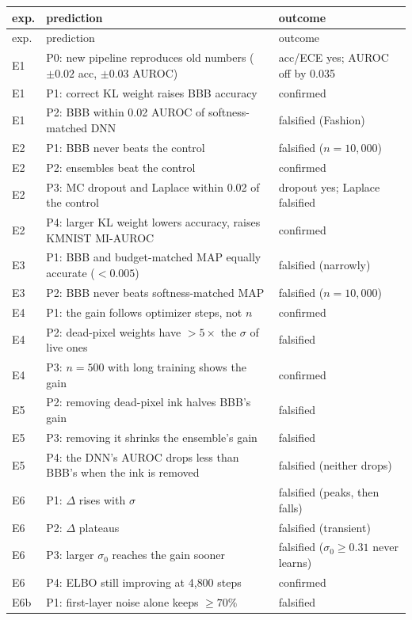 \documentclass[10pt]{article}
\begin{document}
{\small
\begin{longtable}{p{0.9cm}p{8.6cm}p{4.6cm}}
\toprule
exp. & prediction & outcome \\
\midrule
\endfirsthead
\toprule
exp. & prediction & outcome \\
\midrule
\endhead
\bottomrule
\endlastfoot
E1 & P0: new pipeline reproduces old numbers ($\pm0.02$ acc, $\pm0.03$ AUROC) & acc/ECE yes; AUROC off by 0.035 \\
E1 & P1: correct KL weight raises BBB accuracy & confirmed \\
E1 & P2: BBB within 0.02 AUROC of softness-matched DNN & falsified (Fashion) \\
E2 & P1: BBB never beats the control & falsified ($n=10{,}000$) \\
E2 & P2: ensembles beat the control & confirmed \\
E2 & P3: MC dropout and Laplace within 0.02 of the control & dropout yes; Laplace falsified \\
E2 & P4: larger KL weight lowers accuracy, raises KMNIST MI-AUROC & confirmed \\
E3 & P1: BBB and budget-matched MAP equally accurate ($<0.005$) & falsified (narrowly) \\
E3 & P2: BBB never beats softness-matched MAP & falsified ($n=10{,}000$) \\
E4 & P1: the gain follows optimizer steps, not $n$ & confirmed \\
E4 & P2: dead-pixel weights have $>5\times$ the $\sigma$ of live ones & falsified \\
E4 & P3: $n=500$ with long training shows the gain & confirmed \\
E5 & P2: removing dead-pixel ink halves BBB's gain & falsified \\
E5 & P3: removing it shrinks the ensemble's gain & falsified \\
E5 & P4: the DNN's AUROC drops less than BBB's when the ink is removed & falsified (neither drops) \\
E6 & P1: $\Delta$ rises with $\sigma$ & falsified (peaks, then falls) \\
E6 & P2: $\Delta$ plateaus & falsified (transient) \\
E6 & P3: larger $\sigma_0$ reaches the gain sooner & falsified ($\sigma_0\ge0.31$ never learns) \\
E6 & P4: ELBO still improving at 4{,}800 steps & confirmed \\
E6b & P1: first-layer noise alone keeps $\ge70\%$ & falsified \\

\end{longtable}}
\end{document}
